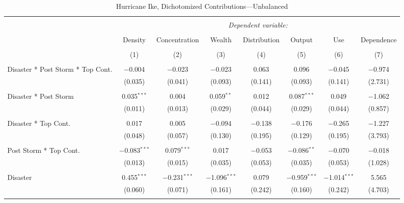 
\begin{table}[!htbp] \centering 
  \caption{Hurricane Ike, Dichotomized Contributions---Unbalanced} 
  \label{} 
\footnotesize 
\begin{tabular}{@{\extracolsep{5pt}}lccccccc} 
\\[-1.8ex]\hline 
\hline \\[-1.8ex] 
 & \multicolumn{7}{c}{\textit{Dependent variable:}} \\ 
\cline{2-8} 
\\[-1.8ex] & Density & Concentration & Wealth & Distribution & Output & Use & Dependence \\ 
\\[-1.8ex] & (1) & (2) & (3) & (4) & (5) & (6) & (7)\\ 
\hline \\[-1.8ex] 
 Disaster * Post Storm * Top Cont. & $-$0.004 & $-$0.023 & $-$0.023 & 0.063 & 0.096 & $-$0.045 & $-$0.974 \\ 
  & (0.035) & (0.041) & (0.093) & (0.141) & (0.093) & (0.141) & (2.731) \\ 
  & & & & & & & \\ 
 Disaster * Post Storm & 0.035$^{***}$ & 0.004 & 0.059$^{**}$ & 0.012 & 0.087$^{***}$ & 0.049 & $-$1.062 \\ 
  & (0.011) & (0.013) & (0.029) & (0.044) & (0.029) & (0.044) & (0.857) \\ 
  & & & & & & & \\ 
 Disaster * Top Cont. & 0.017 & 0.005 & $-$0.094 & $-$0.138 & $-$0.176 & $-$0.265 & $-$1.227 \\ 
  & (0.048) & (0.057) & (0.130) & (0.195) & (0.129) & (0.195) & (3.793) \\ 
  & & & & & & & \\ 
 Post Storm *  Top Cont. & $-$0.083$^{***}$ & 0.079$^{***}$ & 0.017 & $-$0.053 & $-$0.086$^{**}$ & $-$0.070 & $-$0.018 \\ 
  & (0.013) & (0.015) & (0.035) & (0.053) & (0.035) & (0.053) & (1.028) \\ 
  & & & & & & & \\ 
 Disaster & 0.455$^{***}$ & $-$0.231$^{***}$ & $-$1.096$^{***}$ & 0.079 & $-$0.959$^{***}$ & $-$1.014$^{***}$ & 5.565 \\ 
  & (0.060) & (0.071) & (0.161) & (0.242) & (0.160) & (0.242) & (4.703) \\ 
  & & & & & & & \\ 

\end{tabular}
\end{table}
